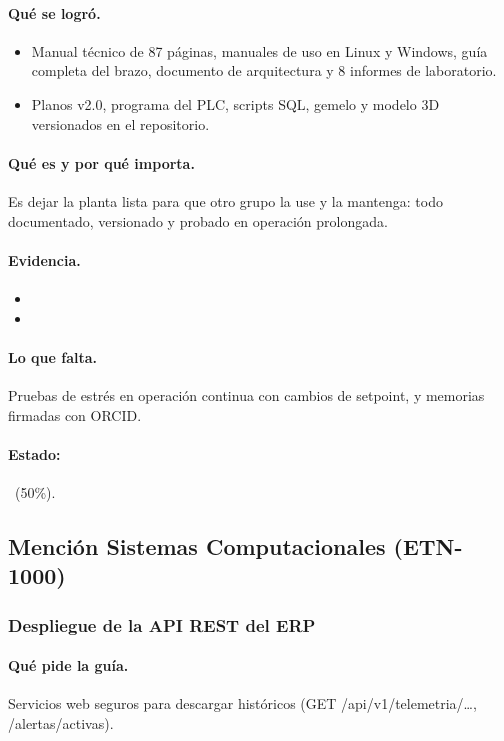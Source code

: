 \documentclass[a4paper,11pt]{article}
\begin{document}
\paragraph{Qué se logró.}
\begin{itemize}
\item Manual técnico de 87 páginas, manuales de uso en Linux y Windows, guía completa del brazo, documento de arquitectura y 8 informes de laboratorio.
\item Planos v2.0, programa del PLC, scripts SQL, gemelo y modelo 3D versionados en el repositorio.
\end{itemize}
\paragraph{Qué es y por qué importa.} Es dejar la planta lista para que otro grupo la use y la mantenga: todo documentado, versionado y probado en operación prolongada.
\paragraph{Evidencia.}
\begin{itemize}\small
\item {}
\item {}
\end{itemize}
\paragraph{Lo que falta.} Pruebas de estrés en operación continua con cambios de setpoint, y memorias firmadas con ORCID.
\paragraph{Estado:} \parcial~(50\%).
\subsection{Mención Sistemas Computacionales (ETN-1000)}
\subsubsection{Despliegue de la API REST del ERP}
\paragraph{Qué pide la guía.} Servicios web seguros para descargar históricos (GET /api/v1/telemetria/…, /alertas/activas).
\end{document}
